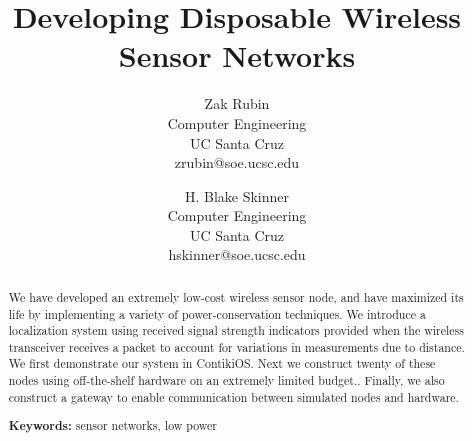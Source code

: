 \documentclass[12pt,twocolumn]{article}
\begin{document}
\begin{multicols}{2}
\title{Developing Disposable Wireless Sensor Networks}
\author{
    Zak Rubin  \\
    Computer Engineering \\
    UC Santa Cruz \\
    zrubin@soe.ucsc.edu \\
  \and
    H. Blake Skinner \\
    Computer Engineering \\
    UC Santa Cruz \\
    hskinner@soe.ucsc.edu
}
\maketitle
\end{multicols}

\begin{abstract}
We have developed an extremely low-cost wireless sensor node, and have maximized its life by implementing a variety of power-conservation techniques. We introduce a localization system using received signal strength indicators provided when the wireless transceiver receives a packet to account for variations in measurements due to distance. We first demonstrate our system in  ContikiOS. Next we construct twenty of these nodes using off-the-shelf hardware on an extremely limited budget.. Finally, we also construct a gateway to enable communication between simulated nodes and hardware. 

{\bf Keywords:} sensor networks, low power
\end{abstract}









\end{document}

